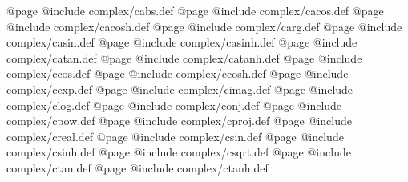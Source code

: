 @page
@include   complex/cabs.def
@page
@include   complex/cacos.def
@page
@include   complex/cacosh.def
@page
@include   complex/carg.def
@page
@include   complex/casin.def
@page
@include   complex/casinh.def
@page
@include   complex/catan.def
@page
@include   complex/catanh.def
@page
@include   complex/ccos.def
@page
@include   complex/ccosh.def
@page
@include   complex/cexp.def
@page
@include   complex/cimag.def
@page
@include   complex/clog.def
@page
@include   complex/conj.def
@page
@include   complex/cpow.def
@page
@include   complex/cproj.def
@page
@include   complex/creal.def
@page
@include   complex/csin.def
@page
@include   complex/csinh.def
@page
@include   complex/csqrt.def
@page
@include   complex/ctan.def
@page
@include   complex/ctanh.def
